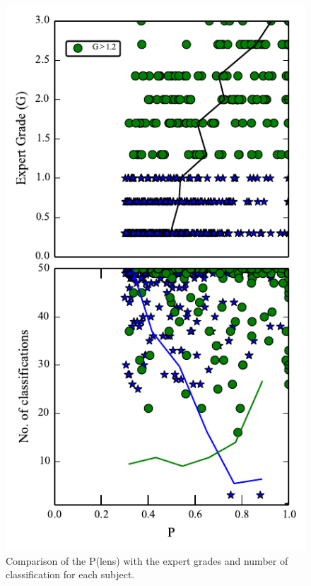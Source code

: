 \documentclass[useAMS,usenatbib,a4paper]{mn2e}
\begin{document}
\begin{figure}
\begin{center}
\includegraphics[scale=1.2]{sw-cfhtls-figs/poffl_expr_ncl.pdf}
\caption{ \label{fig:exp_pn} Comparison of the P(lens) with the expert
grades and number of classification for each subject.  }
\end{center}
\end{figure}
\end{document}
